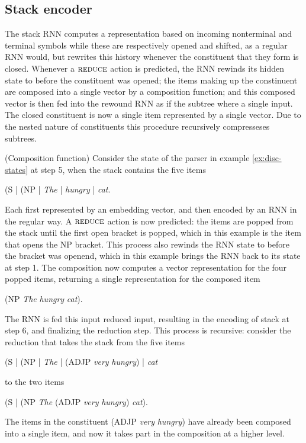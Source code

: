 \subsection{Stack encoder}
The stack RNN computes a representation based on incoming nonterminal and terminal symbols while these are respectively opened and shifted, as a regular RNN would, but rewrites this history whenever the constituent that they form is closed. Whenever a $\textsc{reduce}$ action is predicted, the RNN rewinds its hidden state to before the constituent was opened; the items making up the constinuent are composed into a single vector by a composition function; and this composed vector is then fed into the rewound RNN as if the subtree where a single input. The closed constituent is now a single item represented by a single vector. Due to the nested nature of constituents this procedure recursively compresseses subtrees.

\begin{example}{(Composition function)}
  Consider the state of the parser in example \ref{ex:disc-states} at step 5, when the stack contains the five items
  \begin{center}
    (S | (NP | \textit{The} | \textit{hungry} | \textit{cat}.
  \end{center}
  Each first represented by an embedding vector, and then encoded by an RNN in the regular way. A $\textsc{reduce}$ action is now predicted: the items are popped from the stack until the first open bracket is popped, which in this example is the item that opens the NP bracket. This process also rewinds the RNN state to before the bracket was openend, which in this example brings the RNN back to its state at step 1. The composition now computes a vector representation for the four popped items, returning a single representation for the composed item
  \begin{center}
    (NP \textit{The} \textit{hungry} \textit{cat}).
  \end{center}
  The RNN is fed this input reduced input, resulting in the encoding of stack at step 6, and finalizing the reduction step. This process is recursive: consider the reduction that takes the stack from the five items
  \begin{center}
    (S | (NP | \textit{The} | (ADJP \textit{very} \textit{hungry}) | \textit{cat}
  \end{center}
  to the two items
  \begin{center}
    (S | (NP \textit{The} (ADJP \textit{very} \textit{hungry}) \textit{cat}).
  \end{center}
  The items in the constituent (ADJP \textit{very} \textit{hungry}) have already been composed into a single item, and now it takes part in the composition at a higher level.
\end{example}

